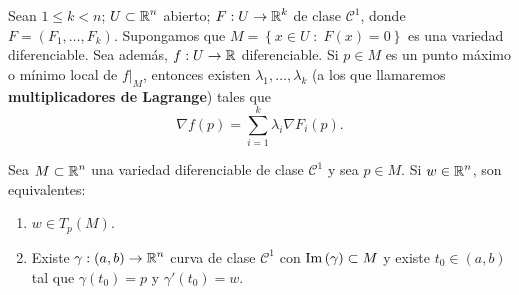 \begin{theorem}
	Sean $\displaystyle 1\leq k < n $; $\displaystyle U \subset \mathbb{R}^{n} $ abierto; $\displaystyle F : U \to \mathbb{R}^{k} $ de clase $\displaystyle \mathcal{C}^{1} $, donde $\displaystyle F = \left(F_{1}, \ldots, F_{k}\right) $. Supongamos que $\displaystyle M= \left\{ x \in U \; : \; F\left(x\right) = 0\right\}  $ es una variedad diferenciable. Sea además, $\displaystyle f : U \to \mathbb{R} $ diferenciable. Si $\displaystyle p \in M $ es un punto máximo o mínimo local de $\displaystyle f|_{M} $, entonces existen $\displaystyle \lambda_{1}, \ldots, \lambda_{k} $ (a los que llamaremos \textbf{multiplicadores de Lagrange}) tales que 
	\[\nabla f\left(p\right) = \sum^{k }_{i = 1}\lambda_{i}\nabla F_{i}\left(p\right) .\]
\end{theorem}
\begin{lema}
Sea $\displaystyle M \subset \mathbb{R}^{n}$ una variedad diferenciable de clase $\displaystyle \mathcal{C}^{1} $ y sea $\displaystyle p \in M $. Si $\displaystyle w \in \mathbb{R}^{n} $, son equivalentes:
\begin{enumerate}
\item $\displaystyle w \in T_{p}\left(M\right) $.
\item Existe $\displaystyle \gamma : \left(a,b\right) \to \mathbb{R}^{n} $ curva de clase $\displaystyle \mathcal{C}^{1} $ con $\displaystyle \operatorname{Im}\left(\gamma \right)\subset M $ y existe $\displaystyle t_{0} \in \left(a,b\right) $ tal que $\displaystyle \gamma\left(t_{0}\right)=p $ y $\displaystyle \gamma'\left(t_{0}\right)=w $.
\end{enumerate}
\end{lema}
